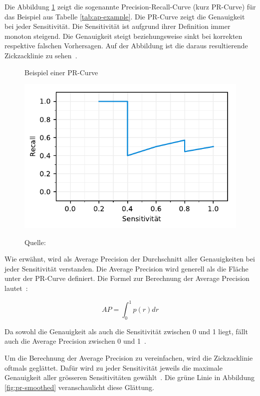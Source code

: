 Die Abbildung \ref{fig:ap-pr} zeigt die sogenannte Precision-Recall-Curve (kurz PR-Curve) für das Beispiel aus Tabelle \ref{tab:ap-example}. Die PR-Curve zeigt die Genauigkeit bei jeder Sensitivität. Die Sensitivität ist aufgrund ihrer Definition immer monoton steigend. Die Genauigkeit steigt beziehungsweise sinkt bei korrekten respektive falschen Vorhersagen. Auf der Abbildung ist die daraus resultierende Zickzacklinie zu sehen~\autocite{AP}.

\begin{figure}[h!]
    \captionsetup{width=.9\linewidth}
    \caption{Beispiel einer PR-Curve}
    \label{fig:ap-pr}
    \centering
    \includegraphics[scale=1]{graphics/matplot/ap__pr.pdf}\\
    \caption*{Quelle: \textcite{AP}}
\end{figure}

Wie erwähnt, wird als Average Precision der Durchschnitt aller Genauigkeiten bei jeder Sensitivität verstanden. Die Average Precision wird generell als die Fläche unter der PR-Curve definiert. Die Formel zur Berechnung der Average Precision lautet~\autocite{AP}:

\nopagebreak 
$$AP = \int_{0}^{1}p(r)dr$$

Da sowohl die Genauigkeit als auch die Sensitivität zwischen 0 und 1 liegt, fällt auch die Average Precision zwischen 0 und 1~\autocite{AP}.

Um die Berechnung der Average Precision zu vereinfachen, wird die Zickzacklinie oftmals geglättet. Dafür wird zu jeder Sensitivität jeweils die maximale Genauigkeit aller grösseren Sensitivitäten gewählt~\autocite{AP}. Die grüne Linie in Abbildung \ref{fig:pr-smoothed} veranschaulicht diese Glättung.

